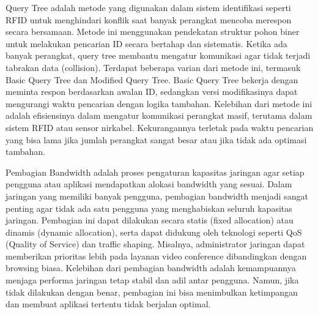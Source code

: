 Query Tree adalah metode yang digunakan dalam sistem identifikasi seperti RFID untuk menghindari konflik saat banyak perangkat mencoba merespon secara bersamaan. Metode ini menggunakan pendekatan struktur pohon biner untuk melakukan pencarian ID secara bertahap dan sistematis. Ketika ada banyak perangkat, query tree membantu mengatur komunikasi agar tidak terjadi tabrakan data (collision). Terdapat beberapa varian dari metode ini, termasuk Basic Query Tree dan Modified Query Tree. Basic Query Tree bekerja dengan meminta respon berdasarkan awalan ID, sedangkan versi modifikasinya dapat mengurangi waktu pencarian dengan logika tambahan. Kelebihan dari metode ini adalah efisiensinya dalam mengatur komunikasi perangkat masif, terutama dalam sistem RFID atau sensor nirkabel. Kekurangannya terletak pada waktu pencarian yang bisa lama jika jumlah perangkat sangat besar atau jika tidak ada optimasi tambahan.

Pembagian Bandwidth adalah proses pengaturan kapasitas jaringan agar setiap pengguna atau aplikasi mendapatkan alokasi bandwidth yang sesuai. Dalam jaringan yang memiliki banyak pengguna, pembagian bandwidth menjadi sangat penting agar tidak ada satu pengguna yang menghabiskan seluruh kapasitas jaringan. Pembagian ini dapat dilakukan secara statis (fixed allocation) atau dinamis (dynamic allocation), serta dapat didukung oleh teknologi seperti QoS (Quality of Service) dan traffic shaping. Misalnya, administrator jaringan dapat memberikan prioritas lebih pada layanan video conference dibandingkan dengan browsing biasa. Kelebihan dari pembagian bandwidth adalah kemampuannya menjaga performa jaringan tetap stabil dan adil antar pengguna. Namun, jika tidak dilakukan dengan benar, pembagian ini bisa menimbulkan ketimpangan dan membuat aplikasi tertentu tidak berjalan optimal.

